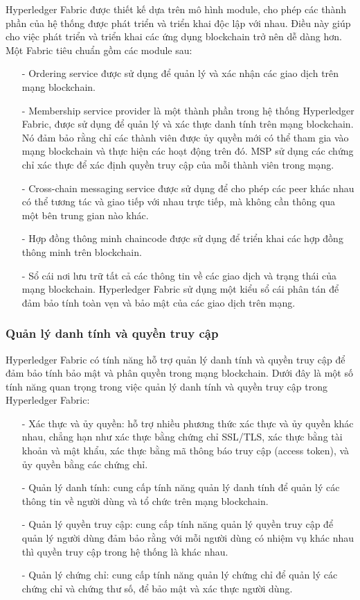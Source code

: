 Hyperledger Fabric được thiết kế dựa trên mô hình module, cho phép các thành phần của hệ 
thống được phát triển và triển khai độc lập với nhau. Điều này giúp cho việc phát triển và 
triển khai các ứng dụng blockchain trở nên dễ dàng hơn.
Một Fabric tiêu chuẩn gồm các module sau:
\begin{itemize}
    \item[-] Ordering service được sử dụng để quản lý và xác nhận các giao dịch 
    trên mạng blockchain.
    
    \item[-] Membership service provider là một thành phần trong hệ thống Hyperledger Fabric, 
    được sử dụng để quản lý và xác thực danh tính trên mạng blockchain. Nó đảm bảo rằng chỉ 
    các thành viên được ủy quyền mới có thể tham gia vào mạng blockchain và thực hiện các 
    hoạt động trên đó. MSP sử dụng các chứng chỉ xác thực để xác định quyền truy cập của mỗi thành viên trong mạng.
    \item[-] Cross-chain messaging service được sử dụng để cho phép các peer khác nhau có thể 
    tương tác và giao tiếp với nhau trực tiếp, mà không cần thông qua một bên trung gian nào khác.
    \item[-] Hợp đồng thông minh chaincode được sử dụng để triển khai các hợp đồng thông minh trên blockchain.
    \item[-] Sổ cái nơi lưu trữ tất cả các thông tin về các giao dịch và trạng thái của mạng blockchain. 
    Hyperledger Fabric sử dụng một kiểu sổ cái phân tán để đảm bảo tính toàn vẹn và bảo mật của các giao dịch trên mạng. 
    
\end{itemize}

\subsubsection{Quản lý danh tính và quyền truy cập}
Hyperledger Fabric có tính năng hỗ trợ quản lý danh tính và quyền truy cập để đảm bảo 
tính bảo mật và phân quyền trong mạng blockchain. Dưới đây là một số tính năng quan trọng 
trong việc quản lý danh tính và quyền truy cập trong Hyperledger Fabric:

\begin{itemize}
    \item[-] Xác thực và ủy quyền: hỗ trợ nhiều phương thức xác thực và ủy quyền khác nhau, 
    chẳng hạn như xác thực bằng chứng chỉ SSL/TLS, xác thực bằng tài khoản và mật khẩu, 
    xác thực bằng mã thông báo truy cập (access token), và ủy quyền bằng các chứng chỉ.
    \item[-] Quản lý danh tính: cung cấp tính năng quản lý danh tính để quản lý các thông tin
    về người dùng và tổ chức trên mạng blockchain.
    \item[-] Quản lý quyền truy cập: cung cấp tính năng quản lý quyền truy cập để quản lý 
    người dùng đảm bảo rằng với mỗi người dùng có nhiệm vụ khác nhau thì quyền truy cập trong
    hệ thống là khác nhau.
    \item[-] Quản lý chứng chỉ: cung cấp tính năng quản lý chứng chỉ để quản lý các chứng chỉ
    và chứng thư số, để bảo mật và xác thực người dùng. 

\end{itemize}
